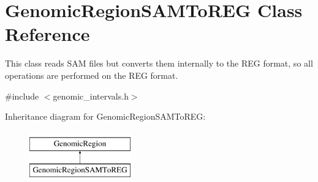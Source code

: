 \hypertarget{classGenomicRegionSAMToREG}{
\section{GenomicRegionSAMToREG Class Reference}
\label{classGenomicRegionSAMToREG}
}


This class reads SAM files but converts them internally to the REG format, so all operations are performed on the REG format.  




{\ttfamily \#include $<$genomic\_\-intervals.h$>$}

Inheritance diagram for GenomicRegionSAMToREG:\begin{figure}[H]
\begin{center}
\leavevmode
\includegraphics[height=2.000000cm]{classGenomicRegionSAMToREG}
\end{center}
\end{figure}
